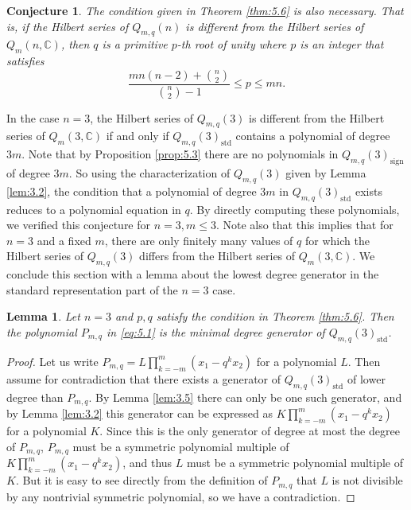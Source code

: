 \documentclass[11pt]{article}
\newtheorem{lemma}[theorem]{Lemma}
\newtheorem{conjecture}[theorem]{Conjecture}
\theoremstyle{definition}
\newcommand{\std}{\mathrm{std}}
\newcommand{\sgn}{\mathrm{sign}}
\newcommand{\C}{\mathbb{C}}
\begin{document}
\begin{conjecture}\label{cong:5.7}
    The condition given in Theorem \ref{thm:5.6} is also necessary. That is, if the Hilbert series of $Q_{m,q}(n)$ is different from the Hilbert series of $Q_m(n,\C)$, then $q$ is a primitive $p$-th root of unity where $p$ is an integer that satisfies
    $$\frac{mn(n-2)+{n\choose{2}}}{{n\choose{2}}-1}\leq p\leq mn.$$
\end{conjecture}

In the case $n=3$, the Hilbert series of $Q_{m,q}(3)$ is different from the Hilbert series of $Q_m(3,\C)$ if and only if $Q_{m,q}(3)_\std$ contains a polynomial of degree $3m$. Note that by Proposition \ref{prop:5.3} there are no polynomials in $Q_{m,q}(3)_\sgn$ of degree $3m$. So using the characterization of $Q_{m,q}(3)$ given by Lemma \ref{lem:3.2}, the condition that a polynomial of degree $3m$ in $Q_{m,q}(3)_\std$ exists reduces to a polynomial equation in $q$. By directly computing these polynomials, we verified this conjecture for $n=3,m\leq 3$. Note also that this implies that for $n=3$ and a fixed $m$, there are only finitely many values of $q$ for which the Hilbert series of $Q_{m,q}(3)$ differs from the Hilbert series of $Q_m(3,\C)$. We conclude this section with a lemma about the lowest degree generator in the standard representation part of the $n=3$ case.

\begin{lemma}
    Let $n=3$ and $p,q$ satisfy the condition in Theorem \ref{thm:5.6}. Then the polynomial $P_{m,q}$ in \ref{eq:5.1} is the minimal degree generator of $Q_{m,q}(3)_\std$.
\end{lemma}
\begin{proof}
    Let us write $P_{m,q}=L\prod_{k=-m}^m(x_1-q^kx_2)$ for a polynomial $L$. Then assume for contradiction that there exists a generator of $Q_{m,q}(3)_\std$ of lower degree than $P_{m,q}$. By Lemma \ref{lem:3.5} there can only be one such generator, and by Lemma \ref{lem:3.2} this generator can be expressed as $K\prod_{k=-m}^m(x_1-q^kx_2)$ for a polynomial $K$. Since this is the only generator of degree at most the degree of $P_{m,q}$, $P_{m,q}$ must be a symmetric polynomial multiple of $K\prod_{k=-m}^m(x_1-q^kx_2)$, and thus $L$ must be a symmetric polynomial multiple of $K$. But it is easy to see directly from the definition of $P_{m,q}$ that $L$ is not divisible by any nontrivial symmetric polynomial, so we have a contradiction.
\end{proof}
\end{document}
